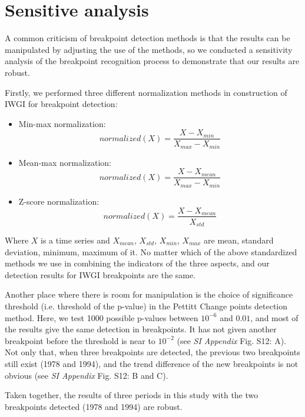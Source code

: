 \documentclass[9pt,twoside,lineno]{pnas-new}
\begin{document}
\newpage
\section*{Sensitive analysis}
A common criticism of breakpoint detection methods is that the results can be manipulated by adjusting the use of the methods, so we conducted a sensitivity analysis of the breakpoint recognition process to demonstrate that our results are robust.

Firstly, we performed three different normalization methods in construction of IWGI for breakpoint detection:

\begin{itemize}
    \item Min-max normalization:
        $$ normalized(X) = \frac{X - X_{min}}{X_{max} - X_{min}} $$
    \item Mean-max normalization:
        $$ normalized(X) = \frac{X - X_{mean}}{X_{max} - X_{min}} $$
    \item Z-score normalization:
        $$ normalized(X) = \frac{X-X_{mean}}{X_{std}} $$
\end{itemize}

Where $X$ is a time series and $X_{mean}$, $X_{std}$, $X_{min}$, $X_{max}$ are mean, standard deviation, minimum, maximum of it.
No matter which of the above standardized methods we use in combining the indicators of the three aspects, and our detection results for IWGI breakpoints are the same.

Another place where there is room for manipulation is the choice of significance threshold (i.e. threshold of the p-value) in the Pettitt Change points detection method. Here, we test 1000 possible p-values between $10^{-6}$ and $0.01$, and most of the results give the same detection in breakpoints.
It has not given another breakpoint before the threshold is near to $10^{-2}$ (see \textit{SI Appendix} Fig. S12: A).
Not only that, when three breakpoints are detected, the previous two breakpoints still exist (1978 and 1994), and the trend difference of the new breakpoints is not obvious (see \textit{SI Appendix} Fig. S12: B and C).

Taken together, the results of three periods in this study with the two breakpoints detected (1978 and 1994) are robust.
\end{document}
